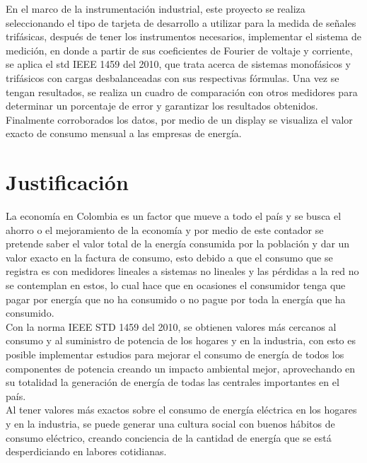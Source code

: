En el marco de la instrumentación industrial, este proyecto se realiza seleccionando el tipo de tarjeta de desarrollo a utilizar para la medida de señales trifásicas, después de tener los instrumentos necesarios, implementar el sistema de medición, en donde a partir de sus coeficientes de Fourier de voltaje y corriente, se aplica el std IEEE 1459 del 2010, que trata acerca de sistemas monofásicos y trifásicos con cargas desbalanceadas con sus respectivas fórmulas. Una vez se tengan resultados, se realiza un cuadro de comparación con otros medidores para determinar un porcentaje de error y garantizar los resultados obtenidos. Finalmente corroborados los datos, por medio de un display se visualiza el valor exacto de consumo mensual a las empresas de energía. \\



\newpage{\cleardoublepage}
\chapter{Justificación}

La economía en Colombia es un factor que mueve a todo el país y se busca el ahorro o el mejoramiento de la economía y por medio de este contador se pretende saber el valor total de la energía consumida por la población y dar un valor exacto en la factura de  consumo, esto debido a que el consumo que se registra es con medidores lineales a sistemas no lineales y las pérdidas a la red no se contemplan en estos, lo cual hace que en ocasiones el consumidor tenga que pagar por energía que no ha consumido o no pague por toda la energía que ha consumido.\\

Con la norma IEEE STD 1459 del 2010, se obtienen valores más cercanos al consumo y al suministro de potencia de los hogares y en la industria, con esto es posible implementar estudios para mejorar el consumo de energía de todos los componentes de potencia creando un impacto ambiental mejor, aprovechando en su totalidad la generación de energía de todas las centrales importantes en el país.\\
 
Al tener valores más exactos sobre el consumo de energía eléctrica en los hogares y en la industria, se puede generar una cultura social con buenos hábitos de consumo eléctrico, creando conciencia de la cantidad de energía que se está desperdiciando en labores cotidianas.\\


